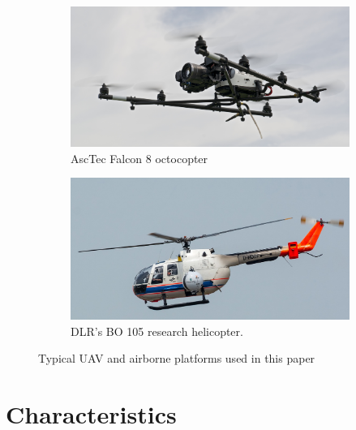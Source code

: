\documentclass[%
  headings = standardclasses, %
]{tumDiss}
\begin{document}
\begin{figure}[ht!]
    \centering
    \begin{subfigure}{.49\textwidth }
	\centering
        \includegraphics[width=0.9\linewidth]{uav.jpg}
        \caption{AscTec Falcon 8 octocopter}
    \end{subfigure}%
    \begin{subfigure}{.49\textwidth}
	\centering
        \includegraphics[width=0.9\linewidth]{aerial.jpg}
        \caption{DLR’s BO 105 research helicopter.}
    \end{subfigure}
\caption{Typical UAV and airborne platforms used in this paper}
\label{fig:platforms}
\end{figure}

\section{Characteristics}
\end{document}
